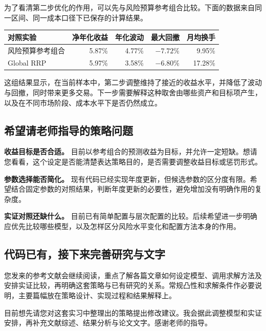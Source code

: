 \documentclass[UTF8,zihao=-4]{ctexart}
\begin{document}
为了看清第二步优化的作用，可以先与风险预算参考组合比较。下面的数据来自同一区间、同一成本口径下已保存的计算结果。
\begin{center}
{\small\renewcommand{\arraystretch}{1.35}
\begin{tabular}{@{}lrrrr@{}}
\toprule
对照实验 & 净年化收益 & 年化波动 & 最大回撤 & 月均换手\\
\midrule
风险预算参考组合 & 5.87\% & 4.77\% & $-7.72\%$ & 9.95\%\\
Global RRP & 5.97\% & 3.58\% & $-6.80\%$ & 17.28\%\\
\bottomrule
\end{tabular}}
\end{center}
这组结果显示，在当前样本中，第二步调整维持了接近的收益水平，并降低了波动与回撤，同时带来更多交易。下一步需要解释这种取舍由哪些资产和目标项产生，以及在不同市场阶段、成本水平下是否仍然成立。

\subsection*{希望请老师指导的策略问题}
\textbf{收益目标是否合适。} 目前以参考组合的预测收益为目标，并允许一定短缺。想请您看看，这个设定是否能清楚表达策略目的，是否需要调整收益目标或惩罚形式。

\textbf{参数选择能否简化。} 现有代码已经实现年度更新，但候选参数的区分度有限。希望结合固定参数的对照结果，判断年度更新的必要性，避免增加没有明确作用的复杂度。

\textbf{实证对照还缺什么。} 目前已有简单配置与层次配置的比较。后续希望进一步明确应优先比较哪些模型，以及怎样区分风险水平变化和配置方法本身的作用。

\subsection*{代码已有，接下来完善研究与文字}
您发来的参考文献会继续阅读，重点了解各篇文章如何设定模型、调用求解方法及安排实证比较，再明确这套策略与已有研究的关系。常规凸性和求解条件作必要说明，主要篇幅放在策略设计、实现过程和结果解释上。

目前想先请您对这套实习中整理出的策略提出修改建议。我会据此调整模型和实证安排，再补充文献综述、结果分析与论文文字。感谢老师的指导。
\end{document}
